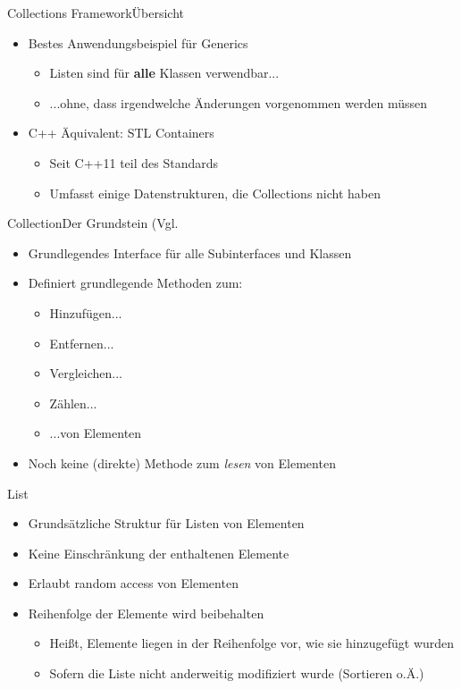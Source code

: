 \begin{frame}{Collections Framework}{Übersicht}
    \begin{itemize}[<+->]
        \item Bestes Anwendungsbeispiel für Generics
        \begin{itemize}
            \item Listen sind für \textbf{alle} Klassen verwendbar...
            \item ...ohne, dass irgendwelche Änderungen vorgenommen werden müssen
        \end{itemize}
        \item C++ Äquivalent: STL Containers
        \begin{itemize}
            \item Seit C++11 teil des Standards
            \item Umfasst einige Datenstrukturen, die Collections nicht haben
        \end{itemize}
    \end{itemize}
\end{frame}

\begin{frame}{Collection}{Der Grundstein (Vgl. \cite{orac:collection}}
    \begin{itemize}[<+->]
        \item Grundlegendes Interface für alle Subinterfaces und Klassen
        \item Definiert grundlegende Methoden zum:
        \begin{itemize}
            \item Hinzufügen...
            \item Entfernen...
            \item Vergleichen...
            \item Zählen...
            \item ...von Elementen
        \end{itemize}
        \item Noch keine (direkte) Methode zum \textit{lesen} von Elementen
    \end{itemize}
\end{frame}

\begin{frame}{List}{}
    \begin{itemize}[<+->]
        \item Grundsätzliche Struktur für Listen von Elementen
        \item Keine Einschränkung der enthaltenen Elemente
        \item Erlaubt random access von Elementen
        \item Reihenfolge der Elemente wird beibehalten
        \begin{itemize}
            \item Heißt, Elemente liegen in der Reihenfolge vor, wie sie hinzugefügt wurden
            \item Sofern die Liste nicht anderweitig modifiziert wurde (Sortieren o.Ä.)
        \end{itemize}
    \end{itemize}
\end{frame}


